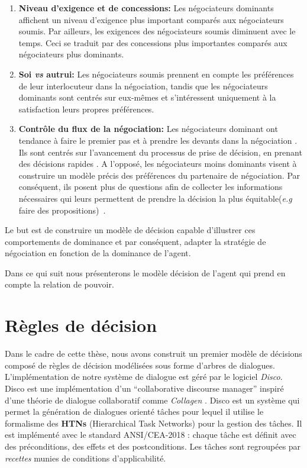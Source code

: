 	\begin{enumerate}
		\item \textbf{Niveau d'exigence et de concessions:} Les négociateurs dominants affichent un niveau d'exigence plus important comparés aux négociateurs soumis. Par ailleurs, les exigences des négociateurs soumis diminuent avec le temps. Ceci se traduit par des concessions plus importantes comparés aux négociateurs plus dominants. \cite{de1995impact}
		
		\item \textbf{Soi \emph{vs} autrui:} Les négociateurs soumis prennent en compte les préférences de leur interlocuteur dans la négociation, tandis que les négociateurs  dominants sont centrés sur eux-mêmes et s'intéressent uniquement à la satisfaction leurs propres préférences. \cite{fiske1993controlling,de1995impact}
		
		\item \textbf{Contrôle du flux de la négociation:}
		Les négociateurs dominant ont tendance à faire le premier pas et à prendre les devants dans la négociation \cite {magee2007domer}. Ils sont centrés sur l'avancement du processus de prise de décision, en prenant des décisions rapides \cite{zablotskaya2012relating}.
		A l'opposé, les négociateurs moins dominants visent à construire un modèle précis des préférences du partenaire de négociation. 
		Par conséquent,  ils posent plus de questions afin de collecter les informations nécessaires qui leurs permettent de prendre la décision la plus équitable(\emph{e.g}  faire des propositions)~\cite{de2004influence}. 
		
	\end{enumerate}
	
	
	Le but est de construire un modèle de décision capable d'illustrer ces comportements de dominance et par conséquent, adapter la stratégie de négociation en fonction de la dominance de l'agent.
	
	Dans ce qui suit nous présenterons le modèle décision de l'agent qui prend en compte la relation de pouvoir.
	
	
	\section{Règles de décision}
	Dans le cadre de cette thèse, nous avons construit un premier modèle de décisions composé de règles de décision modélisées sous forme d'arbres de dialogues. L'implémentation de notre système de dialogue est géré par le logiciel \emph{Disco}. Disco est une implémentation d'un ``collaborative discourse manager'' inspiré d'une théorie de dialogue collaboratif comme \emph{Collagen} \cite{rich1997collagen}. Disco est un système qui permet la génération de dialogues orienté tâches pour lequel il utilise le formalisme des \textbf{HTNs} (Hierarchical Task Networks) \cite{erol1994htn} pour la gestion des tâches. Il est implémenté avec le standard ANSI/CEA-2018 : chaque tâche est définit avec des préconditions, des effets et des postconditions. Les tâches sont regroupées par \emph{recettes} munies de conditions d'applicabilité.
	
